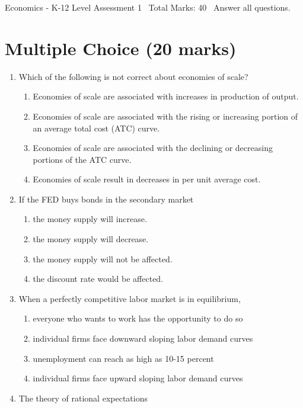 \documentclass[12pt]{article}
\begin{document}
\begin{center}
Economics - K-12 Level Assessment 1 \
Total Marks: 40 \
Answer all questions.
\end{center}

\section*{Multiple Choice (20 marks)}
\begin{enumerate}[label=\arabic*.]
\item Which of the following is not correct about economies of scale?
\begin{enumerate}[label=(\alph*)]
    \item Economies of scale are associated with increases in production of output.
    \item Economies of scale are associated with the rising or increasing portion of an average total cost (ATC) curve.
    \item Economies of scale are associated with the declining or decreasing portions of the ATC curve.
    \item Economies of scale result in decreases in per unit average cost.
\end{enumerate}
\item If the FED buys bonds in the secondary market
\begin{enumerate}[label=(\alph*)]
    \item the money supply will increase.
    \item the money supply will decrease.
    \item the money supply will not be affected.
    \item the discount rate would be affected.
\end{enumerate}
\item When a perfectly competitive labor market is in equilibrium,
\begin{enumerate}[label=(\alph*)]
    \item everyone who wants to work has the opportunity to do so
    \item individual firms face downward sloping labor demand curves
    \item unemployment can reach as high as 10-15 percent
    \item individual firms face upward sloping labor demand curves
\end{enumerate}
\item The theory of rational expectations
\begin{enumerate}[label=(\alph*)]

\end{enumerate}
\end{enumerate}
\end{document}

